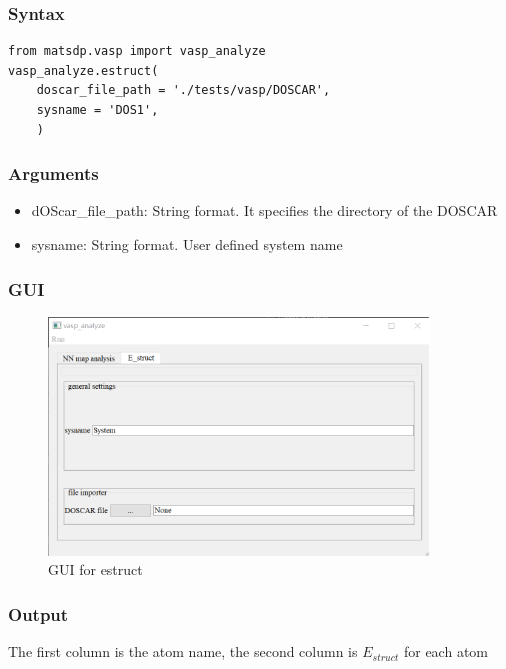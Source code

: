 \documentclass[12pt]{book}
\begin{document}
\subsubsection{Syntax}
\begin{lstlisting}
from matsdp.vasp import vasp_analyze
vasp_analyze.estruct(
    doscar_file_path = './tests/vasp/DOSCAR',
    sysname = 'DOS1',
    )
\end{lstlisting}

\subsubsection{Arguments}

\begin{itemize}
\item dOScar\_file\_path: String format. It specifies the directory of the DOSCAR
\item sysname: String format. User defined system name
\end{itemize}

\subsubsection{GUI}

\begin{figure}[htbp]
\centering
\includegraphics[width=0.9\textwidth]{gui_estruct.pdf}
\caption{GUI for estruct}
\label{fig:GUI_estruct}
\end{figure}

\subsubsection{Output}

The first column is the atom name, the second column is $E_{struct}$ for each atom
\end{document}
